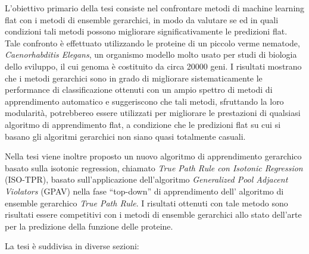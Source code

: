 \documentclass[12pt]{report}
\begin{document}
L'obiettivo primario della tesi  consiste nel confrontare metodi di machine learning flat con i metodi di ensemble gerarchici, in modo da valutare se ed in quali condizioni tali metodi possono migliorare significativamente le predizioni flat. 
Tale confronto  \`e effettuato utilizzando le proteine di un piccolo verme nematode, \emph{Caenorhabditis Elegans}, un organismo modello molto usato per studi di biologia dello sviluppo, il cui genoma  \`e costituito da circa 20000 geni.
I risultati mostrano che i metodi gerarchici sono in grado di migliorare sistematicamente le performance di classificazione ottenuti con un ampio spettro di metodi di apprendimento automatico e suggeriscono che tali metodi, sfruttando la loro modularit\`a, potrebbereo essere utilizzati per migliorare le prestazioni di qualsiasi algoritmo di apprendimento flat, a condizione che le predizioni flat su cui si basano gli algoritmi gerarchici non siano quasi totalmente casuali.

Nella tesi viene inoltre proposto un nuovo algoritmo di apprendimento gerarchico basato sulla isotonic regression, chiamato \emph{True Path Rule con Isotonic Regression} (ISO-TPR),
basato sull'applicazione dell'algoritmo \emph{Generalized Pool Adjacent Violators} (GPAV) nella fase ``top-down'' di apprendimento dell' algoritmo di ensemble gerarchico \emph{True Path Rule}. I risultati ottenuti con tale metodo sono risultati essere competitivi con i metodi di ensemble gerarchici allo stato dell'arte per la predizione della funzione delle proteine.

La tesi \`e suddivisa in diverse sezioni:
\end{document}
